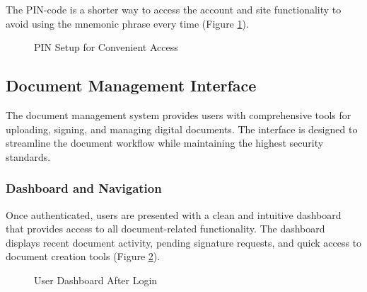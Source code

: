 The PIN-code is a shorter way to access the account and site functionality to avoid using the mnemonic phrase every time (Figure \ref{pin-for-site}). 

\begin{figure}[H]
    \centering
    \caption{PIN Setup for Convenient Access}
    \label{pin-for-site}
\end{figure}

\subsection{Document Management Interface}
The document management system provides users with comprehensive tools for uploading, signing, and managing digital documents. The interface is designed to streamline the document workflow while maintaining the highest security standards.

\subsubsection{Dashboard and Navigation}
Once authenticated, users are presented with a clean and intuitive dashboard that provides access to all document-related functionality. The dashboard displays recent document activity, pending signature requests, and quick access to document creation tools (Figure \ref{logged-in-dashboard}).

\begin{figure}[H]
    \centering
    \caption{User Dashboard After Login}
    \label{logged-in-dashboard}
\end{figure}

